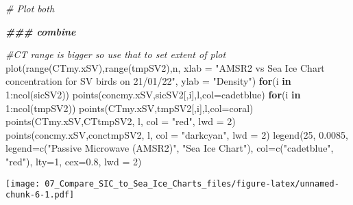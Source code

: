 \documentclass[
]{article}
\newenvironment{Shaded}{\begin{snugshade}}{\end{snugshade}}
\newcommand{\AttributeTok}[1]{\textcolor[rgb]{0.77,0.63,0.00}{#1}}
\newcommand{\CommentTok}[1]{\textcolor[rgb]{0.56,0.35,0.01}{\textit{#1}}}
\newcommand{\ControlFlowTok}[1]{\textcolor[rgb]{0.13,0.29,0.53}{\textbf{#1}}}
\newcommand{\DecValTok}[1]{\textcolor[rgb]{0.00,0.00,0.81}{#1}}
\newcommand{\DocumentationTok}[1]{\textcolor[rgb]{0.56,0.35,0.01}{\textbf{\textit{#1}}}}
\newcommand{\FloatTok}[1]{\textcolor[rgb]{0.00,0.00,0.81}{#1}}
\newcommand{\FunctionTok}[1]{\textcolor[rgb]{0.00,0.00,0.00}{#1}}
\newcommand{\NormalTok}[1]{#1}
\newcommand{\SpecialCharTok}[1]{\textcolor[rgb]{0.00,0.00,0.00}{#1}}
\newcommand{\StringTok}[1]{\textcolor[rgb]{0.31,0.60,0.02}{#1}}
\begin{document}
\begin{Shaded}
\begin{Highlighting}[]
\CommentTok{\# Plot both}

\DocumentationTok{\#\#\# combine}

\CommentTok{\#CT range is bigger so use that to set extent of plot}
\FunctionTok{plot}\NormalTok{(}\FunctionTok{range}\NormalTok{(CTmy.xSV),}\FunctionTok{range}\NormalTok{(tmpSV2),}\StringTok{\textquotesingle{}n\textquotesingle{}}\NormalTok{, }\AttributeTok{xlab =} \StringTok{"AMSR2 vs Sea Ice Chart concentration for SV birds on 21/01/22"}\NormalTok{, }\AttributeTok{ylab =} \StringTok{"Density"}\NormalTok{)}
\ControlFlowTok{for}\NormalTok{(i }\ControlFlowTok{in} \DecValTok{1}\SpecialCharTok{:}\FunctionTok{ncol}\NormalTok{(sicSV2)) }\FunctionTok{points}\NormalTok{(concmy.xSV,sicSV2[,i],}\StringTok{\textquotesingle{}l\textquotesingle{}}\NormalTok{,}\AttributeTok{col=}\StringTok{\textquotesingle{}cadetblue\textquotesingle{}}\NormalTok{)}
\ControlFlowTok{for}\NormalTok{(i }\ControlFlowTok{in} \DecValTok{1}\SpecialCharTok{:}\FunctionTok{ncol}\NormalTok{(tmpSV2)) }\FunctionTok{points}\NormalTok{(CTmy.xSV,tmpSV2[,i],}\StringTok{\textquotesingle{}l\textquotesingle{}}\NormalTok{,}\AttributeTok{col=}\StringTok{\textquotesingle{}coral\textquotesingle{}}\NormalTok{)}
\FunctionTok{points}\NormalTok{(CTmy.xSV,CTtmpSV2, }\StringTok{\textquotesingle{}l\textquotesingle{}}\NormalTok{, }\AttributeTok{col =} \StringTok{"red"}\NormalTok{, }\AttributeTok{lwd =} \DecValTok{2}\NormalTok{)}
\FunctionTok{points}\NormalTok{(concmy.xSV,conctmpSV2, }\StringTok{\textquotesingle{}l\textquotesingle{}}\NormalTok{, }\AttributeTok{col =} \StringTok{"darkcyan"}\NormalTok{, }\AttributeTok{lwd =} \DecValTok{2}\NormalTok{)}
\FunctionTok{legend}\NormalTok{(}\DecValTok{25}\NormalTok{, }\FloatTok{0.0085}\NormalTok{, }\AttributeTok{legend=}\FunctionTok{c}\NormalTok{(}\StringTok{"Passive Microwave (AMSR2)"}\NormalTok{, }\StringTok{"Sea Ice Chart"}\NormalTok{),}
       \AttributeTok{col=}\FunctionTok{c}\NormalTok{(}\StringTok{"cadetblue"}\NormalTok{, }\StringTok{"red"}\NormalTok{), }\AttributeTok{lty=}\DecValTok{1}\NormalTok{, }\AttributeTok{cex=}\FloatTok{0.8}\NormalTok{, }\AttributeTok{lwd =} \DecValTok{2}\NormalTok{)}
\end{Highlighting}
\end{Shaded}

\texttt{[image: 07\_Compare\_SIC\_to\_Sea\_Ice\_Charts\_files/figure-latex/unnamed-chunk-6-1.pdf]}
\end{document}
